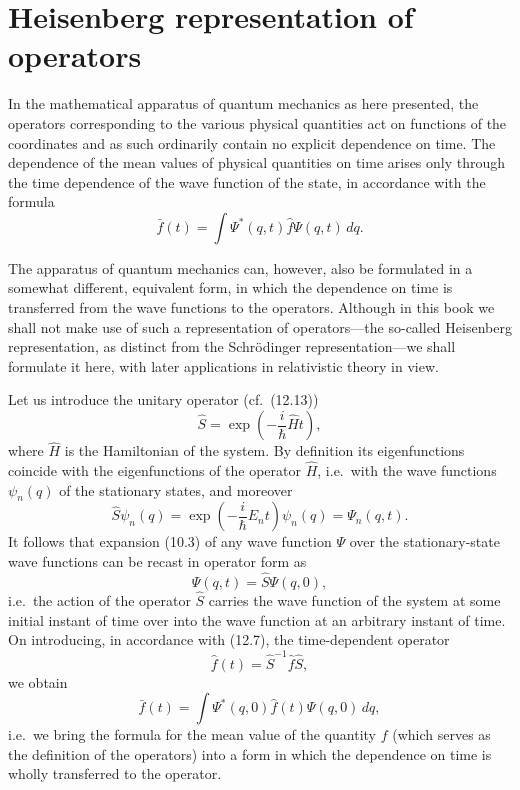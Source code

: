 \section{Heisenberg representation of operators}

In the mathematical apparatus of quantum mechanics as here presented, the
operators corresponding to the various physical quantities act on functions
of the coordinates and as such ordinarily contain no explicit dependence on
time. The dependence of the mean values of physical quantities on time arises
only through the time dependence of the wave function of the state, in
accordance with the formula
\begin{equation}
  \bar f(t)=\int\Psi^*(q,t)\hat f\Psi(q,t)\,dq.
  \tag{13.1}
\end{equation}

The apparatus of quantum mechanics can, however, also be formulated in a
somewhat different, equivalent form, in which the dependence on time is
transferred from the wave functions to the operators. Although in this book
we shall not make use of such a representation of operators---the so-called
Heisenberg representation, as distinct from the Schr\"odinger
representation---we shall formulate it here, with later applications in
relativistic theory in view.

Let us introduce the unitary operator (cf.\ (12.13))
\begin{equation}
  \hat S=\exp\left(-\frac{i}{\hbar}\hat Ht\right),
  \tag{13.2}
\end{equation}
where $\hat H$ is the Hamiltonian of the system. By definition its
eigenfunctions coincide with the eigenfunctions of the operator $\hat H$,
i.e.\ with the wave functions $\psi_n(q)$ of the stationary states, and
moreover
\begin{equation}
  \hat S\psi_n(q)
  =\exp\left(-\frac{i}{\hbar}E_nt\right)\psi_n(q)=\Psi_n(q,t).
  \tag{13.3}
\end{equation}
It follows that expansion (10.3) of any wave function
$\Psi$ over the stationary-state wave functions can be recast in
operator form as
\begin{equation}
  \Psi(q,t)=\hat S\Psi(q,0),
  \tag{13.4}
\end{equation}
i.e.\ the action of the operator $\hat S$ carries the wave function of the
system at some initial instant of time over into the wave function at an
arbitrary instant of time.
On introducing, in accordance with (12.7), the time-dependent operator
\begin{equation}
  \hat f(t)=\hat S^{-1}\hat f\hat S,
  \tag{13.5}
\end{equation}
we obtain
\begin{equation}
  \bar f(t)=\int\Psi^*(q,0)\hat f(t)\Psi(q,0)\,dq,
  \tag{13.6}
\end{equation}
i.e.\ we bring the formula for the mean value of the quantity $f$ (which
serves as the definition of the operators) into a form in which the
dependence on time is wholly transferred to the operator.

